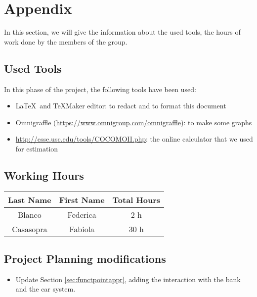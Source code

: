 \section{Appendix} \label{sec:app}
In this section, we will give the information about the used tools, the hours of work done by the members of the group.

\subsection{Used Tools} \label{tools}

In this phase of the project, the following tools have been used:

\begin{itemize}
	\item \LaTeX\ and TeXMaker editor: to redact and to format this document
	\item Omnigraffle (\url{https://www.omnigroup.com/omnigraffle}): to make some graphs
	\item  \url{http://csse.usc.edu/tools/COCOMOII.php}: the online calculator that we used for estimation
\end{itemize}

\subsection{Working Hours} \label{worked}

\begin{table}[htbp]
\begin{center}
\begin{tabular}[t]{ccc}

\hline
\textbf{Last Name} & \textbf{First Name} & \textbf{Total Hours} \\
\hline
Blanco & Federica &  2 h\\
\hline
Casasopra & Fabiola &  30 h\\
\hline

\end{tabular}
\end{center}
\end{table}

\subsection{Project Planning modifications} \label{mod}

\begin{itemize}
\item Update Section \ref{sec:functpointappr}, adding the interaction with the bank and the car system.
\end{itemize}

